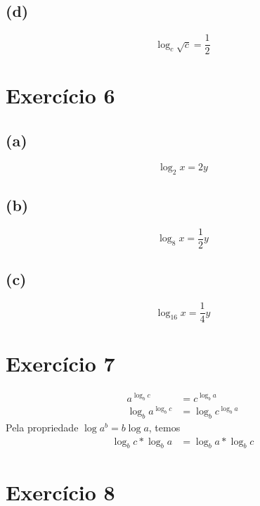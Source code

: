 \documentclass{article}
\begin{document}
\subsection*{(d)}
\begin{equation}
	\log_c \sqrt{c} = \dfrac{1}{2} 
\end{equation}

\section{Exercício 6}
\subsection*{(a)}
\begin{equation}
	\log_2 x = 2y
\end{equation}

\subsection*{(b)}
\begin{equation}
	\log_8 x = \dfrac{1}{2}y
\end{equation}

\subsection*{(c)}
\begin{equation}
	\log_{16} x = \dfrac{1}{4}y
\end{equation}

\section{Exercício 7}
\begin{equation}
\begin{split}
    a^{\log_b c}  & = c^{\log_b a}\\
    \log_b a^{\log_b c} & = \log_b c^{\log_b a}
\end{split}
\end{equation}
    Pela propriedade $\log a^b = b \log a$, temos
\begin{equation}
\begin{split}
    \log_b c * \log_b a & = \log_b a * \log_b c
\end{split}
\end{equation}



\section{Exercício 8}
\end{document}
